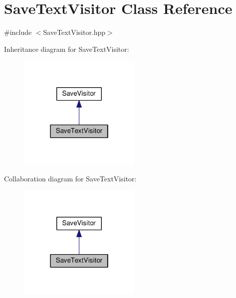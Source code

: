 \hypertarget{class_save_text_visitor}{}\section{Save\+Text\+Visitor Class Reference}
\label{class_save_text_visitor}


{\ttfamily \#include $<$Save\+Text\+Visitor.\+hpp$>$}



Inheritance diagram for Save\+Text\+Visitor\+:\nopagebreak
\begin{figure}[H]
\begin{center}
\leavevmode
\includegraphics[width=166pt]{class_save_text_visitor__inherit__graph}
\end{center}
\end{figure}


Collaboration diagram for Save\+Text\+Visitor\+:\nopagebreak
\begin{figure}[H]
\begin{center}
\leavevmode
\includegraphics[width=166pt]{class_save_text_visitor__coll__graph}
\end{center}
\end{figure}
